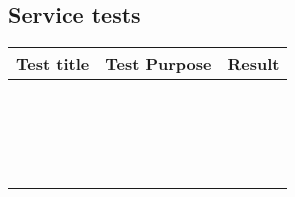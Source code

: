 \subsection{Service tests}
\label{Appendix_Test_Table_Service}
\begin{centering}
\begin{longtable}{| p{5 cm} | p{7 cm} | c |}
\hline
Test title & Test Purpose & Result\\
\hline
 & & \\
\hline
 & & \\
\hline
 & & \\
\hline
 & & \\
\hline
 & & \\
\hline
 & & \\
\hline
 & & \\
\hline
 & & \\
\hline
 & & \\
\hline
 & & \\
\hline
 & & \\
\hline
 & & \\
\hline
 & & \\
\hline
 & & \\
\hline
 & & \\
\hline
 & & \\
\hline
 & & \\
\hline
 & & \\
\hline
\end{longtable}
\end{centering}
